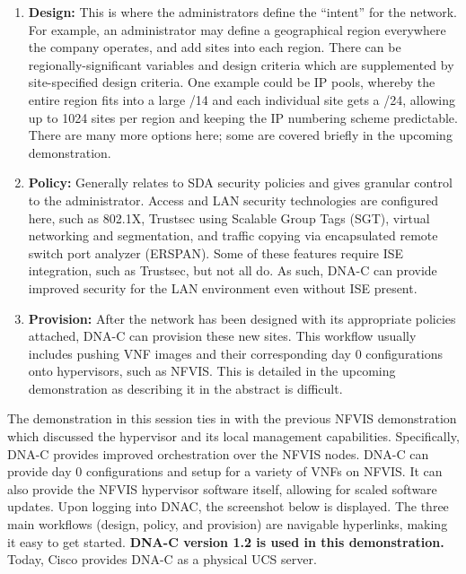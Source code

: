 \begin{enumerate}
  \item \textbf{Design:} This is where the administrators define the ``intent'' for the
  network. For example, an administrator may define a geographical region
  everywhere the company operates, and add sites into each region. There can be
  regionally-significant variables and design criteria which are supplemented by
  site-specified design criteria. One example could be IP pools, whereby the
  entire region fits into a large /14 and each individual site gets a /24,
  allowing up to 1024 sites per region and keeping the IP numbering scheme
  predictable. There are many more options here; some are covered briefly in the
  upcoming demonstration.
  \item \textbf{Policy:} Generally relates to SDA security policies and gives granular
  control to the administrator. Access and LAN security technologies are
  configured here, such as 802.1X, Trustsec using Scalable Group Tags (SGT),
  virtual networking and segmentation, and traffic copying via encapsulated
  remote switch port analyzer (ERSPAN). Some of these features require ISE
  integration, such as Trustsec, but not all do. As such, DNA-C can provide
  improved security for the LAN environment even without ISE present.
  \item \textbf{Provision:} After the network has been designed with its appropriate
  policies attached, DNA-C can provision these new sites. This workflow usually
  includes pushing VNF images and their corresponding day 0 configurations onto
  hypervisors, such as NFVIS\@. This is detailed in the upcoming demonstration as
  describing it in the abstract is difficult.
\end{enumerate}

The demonstration in this session ties in with the previous NFVIS
demonstration which discussed the hypervisor and its local management
capabilities. Specifically, DNA-C provides improved orchestration over the
NFVIS nodes. DNA-C can provide day 0 configurations and setup for a variety of
VNFs on NFVIS\@. It can also provide the NFVIS hypervisor software itself,
allowing for scaled software updates. Upon logging into DNAC, the screenshot
below is displayed. The three main workflows (design, policy, and provision)
are navigable hyperlinks, making it easy to get started. \textbf{DNA-C version 1.2
is used in this demonstration.} Today, Cisco provides DNA-C as a physical UCS
server.


